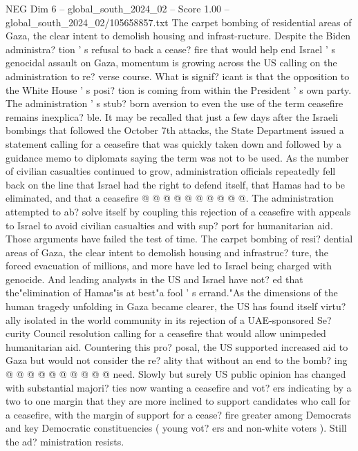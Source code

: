 \begin{textsample}{NEG Dim 6 – global\_south\_2024\_02 – Score 1.00 – global\_south\_2024\_02/105658857.txt}  \label{ex:f6_neg_272}
The carpet bombing of residential areas of Gaza, the clear intent to demolish housing and infrast-ructure.
Despite the Biden administra? tion ' s refusal to back a cease? fire that would help end Israel ' s genocidal assault on Gaza, momentum is growing across the US calling on the administration to re? verse course.
What is signif? icant is that the opposition to the White House ' s posi? tion is coming from within the President ' s own party.
The administration ' s stub? born aversion to even the use of the term ceasefire remains inexplica? ble.
It may be recalled that just a few days after the Israeli bombings that followed the October 7th attacks, the State Department issued a statement calling for a ceasefire that was quickly taken down and followed by a guidance memo to diplomats saying the term was not to be used.
As the number of civilian casualties continued to grow, administration officials repeatedly fell back on the line that Israel had the right to defend itself, that Hamas had to be eliminated, and that a ceasefire @ @ @ @ @ @ @ @ @ @.
The administration attempted to ab? solve itself by coupling this rejection of a ceasefire with appeals to Israel to avoid civilian casualties and with sup? port for humanitarian aid.
Those arguments have failed the test of time.
The carpet bombing of resi? dential areas of Gaza, the clear intent to demolish housing and infrastruc? ture, the forced evacuation of millions, and more have led to Israel being charged with genocide.
And leading analysts in the US and Israel have not? ed that the"elimination of Hamas"is at best"a fool ' s errand."As the dimensions of the human tragedy unfolding in Gaza became clearer, the US has found itself virtu? ally isolated in the world community in its rejection of a UAE-sponsored Se? curity Council resolution calling for a ceasefire that would allow unimpeded humanitarian aid.
Countering this pro? posal, the US supported increased aid to Gaza but would not consider the re? ality that without an end to the bomb? ing @ @ @ @ @ @ @ @ @ @ need.
Slowly but surely US public opinion has changed with substantial majori? ties now wanting a ceasefire and vot? ers indicating by a two to one margin that they are more inclined to support candidates who call for a ceasefire, with the margin of support for a cease? fire greater among Democrats and key Democratic constituencies ( young vot? ers and non-white voters ).
Still the ad? ministration resists.

\end{textsample}
